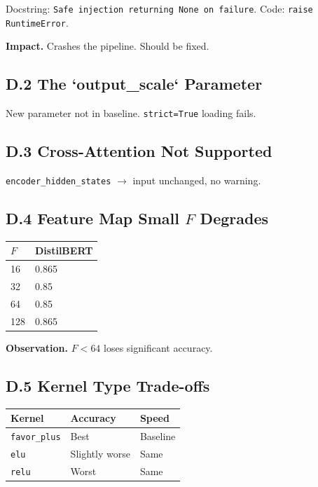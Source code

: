 Docstring: \texttt{Safe injection returning None on failure}. Code: \texttt{raise RuntimeError}.

\textbf{Impact.} Crashes the pipeline. Should be fixed.

\subsection{D.2 The `output\_scale` Parameter}

New parameter not in baseline. \texttt{strict=True} loading fails.

\subsection{D.3 Cross-Attention Not Supported}

\texttt{encoder\_hidden\_states} $\to$ input unchanged, no warning.

\subsection{D.4 Feature Map Small $F$ Degrades}

\begin{table}[H]
\centering
\small
\begin{tabular}{ll}
\toprule
\textbf{$F$} & \textbf{DistilBERT} \\
\midrule
16 & 0.865 \\
32 & 0.85 \\
64 & 0.85 \\
128 & 0.865 \\
\bottomrule
\end{tabular}
\end{table}

\textbf{Observation.} $F < 64$ loses significant accuracy.

\subsection{D.5 Kernel Type Trade-offs}

\begin{table}[H]
\centering
\small
\begin{tabular}{lll}
\toprule
\textbf{Kernel} & \textbf{Accuracy} & \textbf{Speed} \\
\midrule
\texttt{favor\_plus} & Best & Baseline \\
\texttt{elu} & Slightly worse & Same \\
\texttt{relu} & Worst & Same \\
\bottomrule
\end{tabular}
\end{table}

